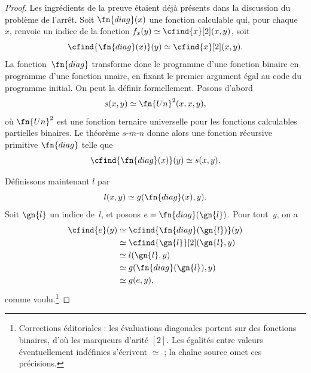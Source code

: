 \documentclass[../../../include/open-logic-section]{subfiles}
\begin{document}
\begin{proof}
Les ingrédients de la preuve étaient déjà
présents dans la discussion du problème de
l'arrêt. Soit $\fn{diag}(x)$ une fonction
calculable qui, pour chaque~$x$, renvoie un
indice de la fonction
$f_x(y)\simeq\cfind{x}[2](x,y)$, soit
\[
\cfind{\fn{diag}(x)}(y) \simeq \cfind{x}[2](x,y).
\]
La fonction~$\fn{diag}$ transforme donc le
programme d'une fonction binaire en programme
d'une fonction unaire, en fixant le premier
argument égal au code du programme initial.
On peut la définir formellement. Posons d'abord
\[
s(x,y) \simeq \fn{Un}^2(x,x,y),
\]
où $\fn{Un}^2$ est une fonction ternaire
universelle pour les fonctions calculables
partielles binaires. Le théorème $s$-$m$-$n$
donne alors une fonction récursive primitive
$\fn{diag}$ telle que
\[
\cfind{\fn{diag}(x)}(y) \simeq s(x,y).
\]

Définissons maintenant $l$ par
\[
l(x,y) \simeq g(\fn{diag}(x),y).
\]
Soit $\gn{l}$ un indice de~$l$, et posons
$e=\fn{diag}(\gn{l})$. Pour tout~$y$, on a
\begin{align*}
\cfind{e}(y) & \simeq \cfind{\fn{diag}(\gn{l})}(y) \\
& \simeq \cfind{\gn{l}}[2](\gn{l}, y) \\
& \simeq l(\gn{l}, y) \\
& \simeq g(\fn{diag}(\gn{l}),y) \\
& \simeq g(e, y),
\end{align*}
comme voulu.\footnote{Corrections éditoriales : les évaluations diagonales portent sur des fonctions binaires, d'où les marqueurs d'arité $[2]$. Les égalités entre valeurs éventuellement indéfinies s'écrivent $\simeq$ ; la chaîne source omet ces précisions.}
\end{proof}
\end{document}

